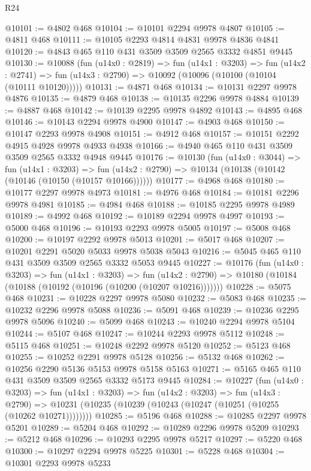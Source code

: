 \begin{lexlean}{R24}
\begin{coremodule}
@10101 := @4802 @468
@10104 := @10101 @2294 @9978 @4807
@10105 := @4811 @468
@10111 := @10105 @2293 @4814 @4831 @9978 @4836 @4841
@10120 := @4843 @465 @110 @431 @3509 @3509 @2565 @3332 @4851 @9445
@10130 := @10088
    (fun (u14x0 : @2819) =>
    fun (u14x1 : @3203) =>
    fun (u14x2 : @2741) => fun (u14x3 : @2790) => @10092 (@10096 (@10100 (@10104 (@10111 @10120)))))
@10131 := @4871 @468
@10134 := @10131 @2297 @9978 @4876
@10135 := @4879 @468
@10138 := @10135 @2296 @9978 @4884
@10139 := @4887 @468
@10142 := @10139 @2295 @9978 @4892
@10143 := @4895 @468
@10146 := @10143 @2294 @9978 @4900
@10147 := @4903 @468
@10150 := @10147 @2293 @9978 @4908
@10151 := @4912 @468
@10157 := @10151 @2292 @4915 @4928 @9978 @4933 @4938
@10166 := @4940 @465 @110 @431 @3509 @3509 @2565 @3332 @4948 @9445
@10176 := @10130
    (fun (u14x0 : @3044) =>
    fun (u14x1 : @3203) =>
    fun (u14x2 : @2790) => @10134 (@10138 (@10142 (@10146 (@10150 (@10157 @10166))))))
@10177 := @4968 @468
@10180 := @10177 @2297 @9978 @4973
@10181 := @4976 @468
@10184 := @10181 @2296 @9978 @4981
@10185 := @4984 @468
@10188 := @10185 @2295 @9978 @4989
@10189 := @4992 @468
@10192 := @10189 @2294 @9978 @4997
@10193 := @5000 @468
@10196 := @10193 @2293 @9978 @5005
@10197 := @5008 @468
@10200 := @10197 @2292 @9978 @5013
@10201 := @5017 @468
@10207 := @10201 @2291 @5020 @5033 @9978 @5038 @5043
@10216 := @5045 @465 @110 @431 @3509 @3509 @2565 @3332 @5053 @9445
@10227 := @10176
    (fun (u14x0 : @3203) =>
    fun (u14x1 : @3203) =>
    fun (u14x2 : @2790) => @10180 (@10184 (@10188 (@10192 (@10196 (@10200 (@10207 @10216)))))))
@10228 := @5075 @468
@10231 := @10228 @2297 @9978 @5080
@10232 := @5083 @468
@10235 := @10232 @2296 @9978 @5088
@10236 := @5091 @468
@10239 := @10236 @2295 @9978 @5096
@10240 := @5099 @468
@10243 := @10240 @2294 @9978 @5104
@10244 := @5107 @468
@10247 := @10244 @2293 @9978 @5112
@10248 := @5115 @468
@10251 := @10248 @2292 @9978 @5120
@10252 := @5123 @468
@10255 := @10252 @2291 @9978 @5128
@10256 := @5132 @468
@10262 := @10256 @2290 @5136 @5153 @9978 @5158 @5163
@10271 := @5165 @465 @110 @431 @3509 @3509 @2565 @3332 @5173 @9445
@10284 := @10227
    (fun (u14x0 : @3203) =>
    fun (u14x1 : @3203) =>
    fun (u14x2 : @3203) =>
    fun (u14x3 : @2790) =>
    @10231 (@10235 (@10239 (@10243 (@10247 (@10251 (@10255 (@10262 @10271))))))))
@10285 := @5196 @468
@10288 := @10285 @2297 @9978 @5201
@10289 := @5204 @468
@10292 := @10289 @2296 @9978 @5209
@10293 := @5212 @468
@10296 := @10293 @2295 @9978 @5217
@10297 := @5220 @468
@10300 := @10297 @2294 @9978 @5225
@10301 := @5228 @468
@10304 := @10301 @2293 @9978 @5233

\end{coremodule}
\end{lexlean}
